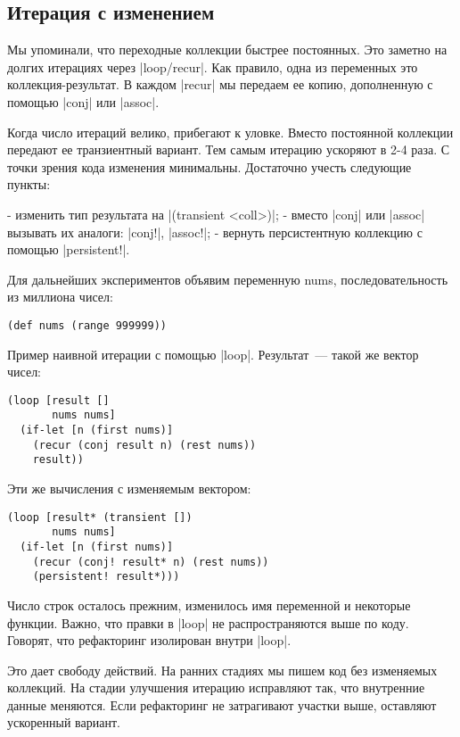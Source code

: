 \subsection{Итерация с изменением}

Мы упоминали, что переходные коллекции быстрее постоянных. Это заметно на долгих
итерациях через \spverb|loop/recur|. Как правило, одна из переменных это
коллекция-результат. В каждом \spverb|recur| мы передаем ее копию, дополненную с
помощью \spverb|conj| или \spverb|assoc|.

Когда число итераций велико, прибегают к уловке. Вместо постоянной коллекции
передают ее транзиентный вариант. Тем самым итерацию ускоряют в 2-4 раза. С
точки зрения кода изменения минимальны. Достаточно учесть следующие пункты:

- изменить тип результата на \spverb|(transient <coll>)|;
- вместо \spverb|conj| или \spverb|assoc| вызывать их аналоги: \spverb|conj!|, \spverb|assoc!|;
- вернуть персистентную коллекцию с помощью \spverb|persistent!|.

Для дальнейших экспериментов объявим переменную nums, последовательность из
миллиона чисел:

\begin{verbatim}
(def nums (range 999999))
\end{verbatim}

Пример наивной итерации с помощью \spverb|loop|. Результат~--- такой же вектор чисел:

\begin{verbatim}
(loop [result []
       nums nums]
  (if-let [n (first nums)]
    (recur (conj result n) (rest nums))
    result))
\end{verbatim}

Эти же вычисления с изменяемым вектором:

\begin{verbatim}
(loop [result* (transient [])
       nums nums]
  (if-let [n (first nums)]
    (recur (conj! result* n) (rest nums))
    (persistent! result*)))
\end{verbatim}

Число строк осталось прежним, изменилось имя переменной и некоторые
функции. Важно, что правки в \spverb|loop| не распространяются выше по коду. Говорят,
что рефакторинг изолирован внутри \spverb|loop|.

Это дает свободу действий. На ранних стадиях мы пишем код без изменяемых
коллекций. На стадии улучшения итерацию исправляют так, что внутренние данные
меняются. Если рефакторинг не затрагивают участки выше, оставляют ускоренный
вариант.

